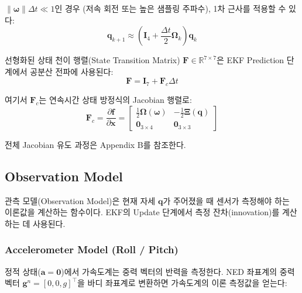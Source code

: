             $\|\boldsymbol{\omega}\|\Delta t \ll 1$인 경우 (저속 회전 또는 높은 샘플링 주파수), 1차 근사를 적용할 수 있다:\\

            \begin{equation}
                \mathbf{q}_{k+1} \approx \left(\mathbf{I}_4 + \frac{\Delta t}{2}\boldsymbol{\Omega}_k\right)\mathbf{q}_k
                \label{eq:quat_discrete_approx}
            \end{equation}

            선형화된 상태 천이 행렬(State Transition Matrix) $\mathbf{F} \in \mathbb{R}^{7\times 7}$은 EKF Prediction 단계에서 공분산 전파에 사용된다:\\

            \begin{equation}
                \mathbf{F} = \mathbf{I}_7 + \mathbf{F}_c \Delta t
                \label{eq:state_transition}
            \end{equation}

            \noindent 여기서 $\mathbf{F}_c$는 연속시간 상태 방정식의 Jacobian 행렬로:\\

            \begin{equation}
                \mathbf{F}_c = \frac{\partial \mathbf{f}}{\partial \mathbf{x}} = \begin{bmatrix}
                    \frac{1}{2}\boldsymbol{\Omega}(\boldsymbol{\omega}) & -\frac{1}{2}\boldsymbol{\Xi}(\mathbf{q}) \\
                    \mathbf{0}_{3\times 4} & \mathbf{0}_{3\times 3}
                \end{bmatrix}
                \label{eq:jacobian_Fc}
            \end{equation}

            전체 Jacobian 유도 과정은 Appendix B를 참조한다.\\

    \subsection{Observation Model}
        관측 모델(Observation Model)은 현재 자세 $\mathbf{q}$가 주어졌을 때 센서가 측정해야 하는 이론값을 계산하는 함수이다. EKF의 Update 단계에서 측정 잔차(innovation)를 계산하는 데 사용된다.\\
        
        \subsubsection{Accelerometer Model (Roll / Pitch)}
            정적 상태($\mathbf{a} = \mathbf{0}$)에서 가속도계는 중력 벡터의 반력을 측정한다. NED 좌표계의 중력 벡터 $\mathbf{g}^n = [0, 0, g]^\top$을 바디 좌표계로 변환하면 가속도계의 이론 측정값을 얻는다:\\

